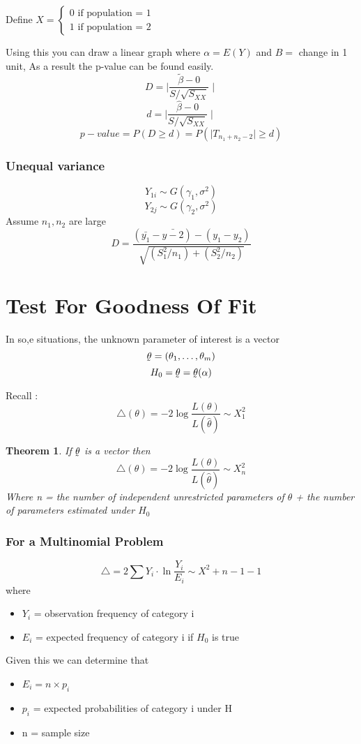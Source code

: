 \documentclass{article}
\newcounter{lecnum}
\newtheorem{theorem}{Theorem}[lecnum]
\begin{document}
Define \(X = \begin{cases} 0 \text{ if population = 1}  \\ 1 \text{ if population = 2}\end{cases} \)

Using this you can draw a linear graph where \(\alpha = E(Y) \) and \(B =\) change in 1 unit, As a result the p-value can be found easily. 
$$ D = \mid \frac{\tilde{\beta} - 0}{S / \sqrt{S_{XX}}} \mid $$
$$ d = \mid \frac{\hat{\beta} - 0}{S / \sqrt{S_{XX}}} \mid $$
$$ p-value = P(D \geq d) = P(\mid T_{n_1 + n_2 - 2} \mid \geq d) $$

\subsubsection*{Unequal variance}
$$ Y_{1i} \sim G(\gamma_1, \sigma^2) $$
$$ Y_{2j} \sim G(\gamma_2, \sigma^2) $$
Assume \(n_1, n_2\) are large 
$$ D = \frac{(\bar{y_1} - \bar{y-2}) - (y_1 - y_2)}{\sqrt{(S_1^2 / n_1) + (S_2^2 / n_2)}}$$

\section{Test For Goodness Of Fit}
In so,e situations, the unknown parameter of interest is a vector 
$$ \underaccent{\tilde}{\theta} = (\theta_1, \ldots, \theta_m)$$
$$ H_0 =  \underaccent{\tilde}{\theta} =  \underaccent{\tilde}{\theta} ( \alpha) $$

Recall : 
$$ \bigtriangleup(\theta) = -2 \log \frac{L(\theta)}{L(\hat{\theta}) } \sim X^2_1$$

\begin{theorem}
If \( \underaccent{\tilde}{\theta}\) is a vector then 
$$ \bigtriangleup(\theta) = -2 \log \frac{L(\theta)}{L(\hat{\theta}) } \sim X^2_n $$
Where n = the number of independent unrestricted parameters of \(\theta\) + the number of parameters estimated under \(H_0\)
\end{theorem}

\subsubsection*{For a Multinomial Problem}
$$ \bigtriangleup = 2 \sum Y_i \cdot \ln \frac{Y_i}{E_i}  \sim X^2+{n - 1- 1} $$
where 
\begin{itemize}
\item \(Y_i\) = observation frequency of category i 
\item \(E_i\) = expected frequency of category i if \(H_0\) is true
\end{itemize}
Given this we can determine that 
\begin{itemize}
\item \(E_i = n \times p_i\) 
\item \(p_i\) = expected probabilities of category i under H
\item n = sample size  
\end{itemize}
\end{document}
